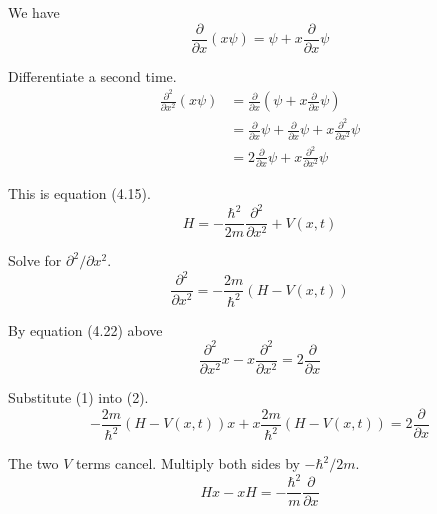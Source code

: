 


\bigskip
We have
\begin{equation*}
\frac{\partial}{\partial x}(x\psi)=\psi+x\frac{\partial}{\partial x}\psi
\end{equation*}

Differentiate a second time.
\begin{align*}
\frac{\partial^2}{\partial x^2}(x\psi)
&=\frac{\partial}{\partial x}\left(\psi+x\frac{\partial}{\partial x}\psi\right)
\\
&=\frac{\partial}{\partial x}\psi+\frac{\partial}{\partial x}\psi+x\frac{\partial^2}{\partial x^2}\psi
\\
&=2\frac{\partial}{\partial x}\psi+x\frac{\partial^2}{\partial x^2}\psi
\end{align*}

This is equation (4.15).
\begin{equation*}
H=-\frac{\hbar^2}{2m}\frac{\partial^2}{\partial x^2}+V(x,t)
\end{equation*}

Solve for $\partial^2/\partial x^2$.
\begin{equation*}
\frac{\partial^2}{\partial x^2}=-\frac{2m}{\hbar^2}(H-V(x,t))
\tag{1}
\end{equation*}

By equation (4.22) above
\begin{equation*}
\frac{\partial^2}{\partial x^2}x-x\frac{\partial^2}{\partial x^2}=2\frac{\partial}{\partial x}
\tag{2}
\end{equation*}

Substitute (1) into (2).
\begin{equation*}
-\frac{2m}{\hbar^2}(H-V(x,t))x+x\frac{2m}{\hbar^2}(H-V(x,t))=2\frac{\partial}{\partial x}
\end{equation*}

The two $V$ terms cancel.
Multiply both sides by $-\hbar^2/2m$.
\begin{equation*}
Hx-xH=-\frac{\hbar^2}{m}\frac{\partial}{\partial x}
\end{equation*}


